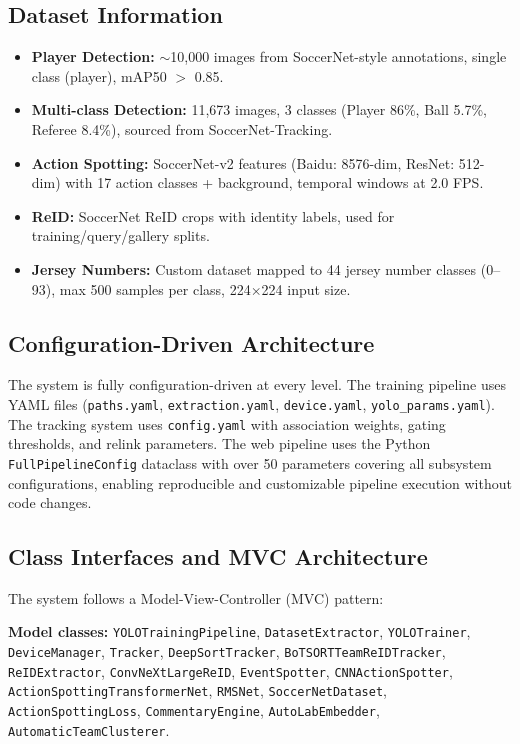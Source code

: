 \documentclass[10pt,twocolumn,a4paper]{article}
\begin{document}
\subsection{Dataset Information}

\begin{itemize}[noitemsep,topsep=0pt]
  \item \textbf{Player Detection:} $\sim$10,000 images from SoccerNet-style annotations, single class (player), mAP50 $>$ 0.85.
  \item \textbf{Multi-class Detection:} 11,673 images, 3 classes (Player 86\%, Ball 5.7\%, Referee 8.4\%), sourced from SoccerNet-Tracking.
  \item \textbf{Action Spotting:} SoccerNet-v2 features (Baidu: 8576-dim, ResNet: 512-dim) with 17 action classes + background, temporal windows at 2.0 FPS.
  \item \textbf{ReID:} SoccerNet ReID crops with identity labels, used for training/query/gallery splits.
  \item \textbf{Jersey Numbers:} Custom dataset mapped to 44 jersey number classes (0--93), max 500 samples per class, 224$\times$224 input size.
\end{itemize}

\subsection{Configuration-Driven Architecture}

The system is fully configuration-driven at every level. The training pipeline uses YAML files (\texttt{paths.yaml}, \texttt{extraction.yaml}, \texttt{device.yaml}, \texttt{yolo\_params.yaml}). The tracking system uses \texttt{config.yaml} with association weights, gating thresholds, and relink parameters. The web pipeline uses the Python \texttt{FullPipelineConfig} dataclass with over 50 parameters covering all subsystem configurations, enabling reproducible and customizable pipeline execution without code changes.

\subsection{Class Interfaces and MVC Architecture}

The system follows a Model-View-Controller (MVC) pattern:

\textbf{Model classes:} \texttt{YOLOTrainingPipeline}, \texttt{DatasetExtractor}, \texttt{YOLOTrainer}, \texttt{DeviceManager}, \texttt{Tracker}, \texttt{DeepSortTracker}, \texttt{BoTSORTTeamReIDTracker}, \texttt{ReIDExtractor}, \texttt{ConvNeXtLargeReID}, \texttt{EventSpotter}, \texttt{CNNActionSpotter}, \texttt{ActionSpottingTransformerNet}, \texttt{RMSNet}, \texttt{SoccerNetDataset}, \texttt{ActionSpottingLoss}, \texttt{CommentaryEngine}, \texttt{AutoLabEmbedder}, \texttt{AutomaticTeamClusterer}.
\end{document}
